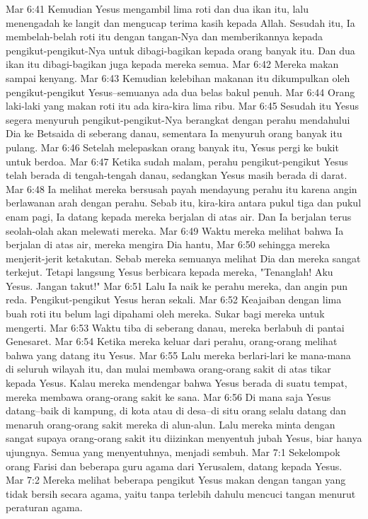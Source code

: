 Mar 6:41  Kemudian Yesus mengambil lima roti dan dua ikan itu, lalu menengadah ke langit dan mengucap terima kasih kepada Allah. Sesudah itu, Ia membelah-belah roti itu dengan tangan-Nya dan memberikannya kepada pengikut-pengikut-Nya untuk dibagi-bagikan kepada orang banyak itu. Dan dua ikan itu dibagi-bagikan juga kepada mereka semua.
Mar 6:42  Mereka makan sampai kenyang.
Mar 6:43  Kemudian kelebihan makanan itu dikumpulkan oleh pengikut-pengikut Yesus--semuanya ada dua belas bakul penuh.
Mar 6:44  Orang laki-laki yang makan roti itu ada kira-kira lima ribu.
Mar 6:45  Sesudah itu Yesus segera menyuruh pengikut-pengikut-Nya berangkat dengan perahu mendahului Dia ke Betsaida di seberang danau, sementara Ia menyuruh orang banyak itu pulang.
Mar 6:46  Setelah melepaskan orang banyak itu, Yesus pergi ke bukit untuk berdoa.
Mar 6:47  Ketika sudah malam, perahu pengikut-pengikut Yesus telah berada di tengah-tengah danau, sedangkan Yesus masih berada di darat.
Mar 6:48  Ia melihat mereka bersusah payah mendayung perahu itu karena angin berlawanan arah dengan perahu. Sebab itu, kira-kira antara pukul tiga dan pukul enam pagi, Ia datang kepada mereka berjalan di atas air. Dan Ia berjalan terus seolah-olah akan melewati mereka.
Mar 6:49  Waktu mereka melihat bahwa Ia berjalan di atas air, mereka mengira Dia hantu,
Mar 6:50  sehingga mereka menjerit-jerit ketakutan. Sebab mereka semuanya melihat Dia dan mereka sangat terkejut. Tetapi langsung Yesus berbicara kepada mereka, "Tenanglah! Aku Yesus. Jangan takut!"
Mar 6:51  Lalu Ia naik ke perahu mereka, dan angin pun reda. Pengikut-pengikut Yesus heran sekali.
Mar 6:52  Keajaiban dengan lima buah roti itu belum lagi dipahami oleh mereka. Sukar bagi mereka untuk mengerti.
Mar 6:53  Waktu tiba di seberang danau, mereka berlabuh di pantai Genesaret.
Mar 6:54  Ketika mereka keluar dari perahu, orang-orang melihat bahwa yang datang itu Yesus.
Mar 6:55  Lalu mereka berlari-lari ke mana-mana di seluruh wilayah itu, dan mulai membawa orang-orang sakit di atas tikar kepada Yesus. Kalau mereka mendengar bahwa Yesus berada di suatu tempat, mereka membawa orang-orang sakit ke sana.
Mar 6:56  Di mana saja Yesus datang--baik di kampung, di kota atau di desa--di situ orang selalu datang dan menaruh orang-orang sakit mereka di alun-alun. Lalu mereka minta dengan sangat supaya orang-orang sakit itu diizinkan menyentuh jubah Yesus, biar hanya ujungnya. Semua yang menyentuhnya, menjadi sembuh.
Mar 7:1  Sekelompok orang Farisi dan beberapa guru agama dari Yerusalem, datang kepada Yesus.
Mar 7:2  Mereka melihat beberapa pengikut Yesus makan dengan tangan yang tidak bersih secara agama, yaitu tanpa terlebih dahulu mencuci tangan menurut peraturan agama.
